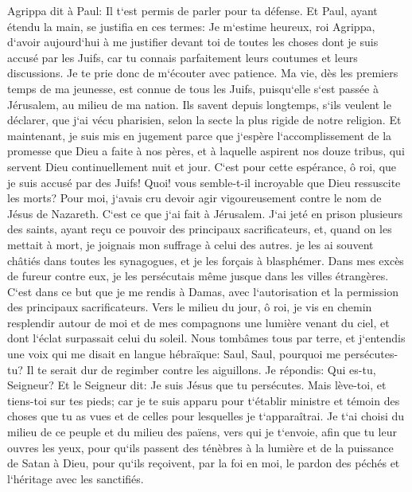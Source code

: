 \verse Agrippa dit à Paul: Il t`est permis de parler pour ta défense. Et Paul, ayant étendu la main, se justifia en ces termes: 
\verse Je m`estime heureux, roi Agrippa, d`avoir aujourd`hui à me justifier devant toi de toutes les choses dont je suis accusé par les Juifs, 
\verse car tu connais parfaitement leurs coutumes et leurs discussions. Je te prie donc de m`écouter avec patience. 
\verse Ma vie, dès les premiers temps de ma jeunesse, est connue de tous les Juifs, puisqu`elle s`est passée à Jérusalem, au milieu de ma nation. 
\verse Ils savent depuis longtemps, s`ils veulent le déclarer, que j`ai vécu pharisien, selon la secte la plus rigide de notre religion. 
\verse Et maintenant, je suis mis en jugement parce que j`espère l`accomplissement de la promesse que Dieu a faite à nos pères, 
\verse et à laquelle aspirent nos douze tribus, qui servent Dieu continuellement nuit et jour. C`est pour cette espérance, ô roi, que je suis accusé par des Juifs! 
\verse Quoi! vous semble-t-il incroyable que Dieu ressuscite les morts? 
\verse Pour moi, j`avais cru devoir agir vigoureusement contre le nom de Jésus de Nazareth. 
\verse C`est ce que j`ai fait à Jérusalem. J`ai jeté en prison plusieurs des saints, ayant reçu ce pouvoir des principaux sacrificateurs, et, quand on les mettait à mort, je joignais mon suffrage à celui des autres. 
\verse je les ai souvent châtiés dans toutes les synagogues, et je les forçais à blasphémer. Dans mes excès de fureur contre eux, je les persécutais même jusque dans les villes étrangères. 
\verse C`est dans ce but que je me rendis à Damas, avec l`autorisation et la permission des principaux sacrificateurs. 
\verse Vers le milieu du jour, ô roi, je vis en chemin resplendir autour de moi et de mes compagnons une lumière venant du ciel, et dont l`éclat surpassait celui du soleil. 
\verse Nous tombâmes tous par terre, et j`entendis une voix qui me disait en langue hébraïque: Saul, Saul, pourquoi me persécutes-tu? Il te serait dur de regimber contre les aiguillons. 
\verse Je répondis: Qui es-tu, Seigneur? Et le Seigneur dit: Je suis Jésus que tu persécutes. 
\verse Mais lève-toi, et tiens-toi sur tes pieds; car je te suis apparu pour t`établir ministre et témoin des choses que tu as vues et de celles pour lesquelles je t`apparaîtrai. 
\verse Je t`ai choisi du milieu de ce peuple et du milieu des païens, vers qui je t`envoie, 
\verse afin que tu leur ouvres les yeux, pour qu`ils passent des ténèbres à la lumière et de la puissance de Satan à Dieu, pour qu`ils reçoivent, par la foi en moi, le pardon des péchés et l`héritage avec les sanctifiés. 
